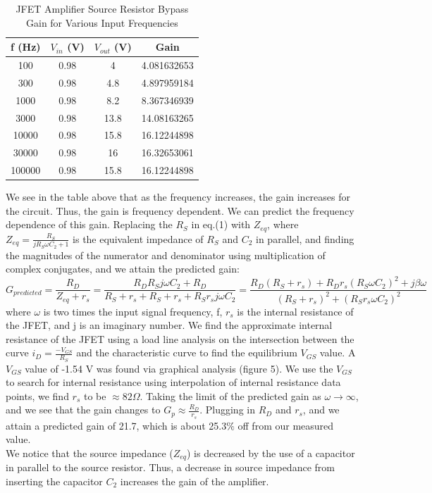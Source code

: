 \documentclass{article}
\begin{document}
    \begin{table}[H]
        \centering
        \caption{JFET Amplifier Source Resistor Bypass Gain for Various Input Frequencies}
        \label{my-label}
        \begin{tabular}{cccc}
        \textbf{f (Hz)} & \textbf{$V_{in}$ (V)} & \textbf{$V_{out}$ (V)} & \textbf{Gain} \\ \hline
        100 & 0.98 & 4 & 4.081632653 \\
        300 & 0.98 & 4.8 & 4.897959184 \\
        1000 & 0.98 & 8.2 & 8.367346939 \\
        3000 & 0.98 & 13.8 & 14.08163265 \\
        10000 & 0.98 & 15.8 & 16.12244898 \\
        30000 & 0.98 & 16 & 16.32653061 \\
        100000 & 0.98 & 15.8 & 16.12244898
        \end{tabular}
    \end{table}
    We see in the table above that as the frequency increases, the gain increases for the circuit. Thus, the gain is frequency dependent. We can predict the frequency dependence of this gain. Replacing the $R_S$ in eq.(1) with $Z_{eq}$, where $Z_{eq} = \frac{R_S}{jR_S \omega C_2 + 1}$ is the equivalent impedance of $R_S$ and $C_2$ in parallel, and finding the magnitudes of the numerator and denominator using multiplication of complex conjugates, and we attain the predicted gain:
    \begin{equation}
        G_{predicted} = \frac{R_D}{Z_{eq} + r_s} = \frac{R_D R_S j \omega C_2 + R_D}{R_S + r_s + R_S + r_s + R_S r_s j \omega C_2} = \frac{R_D(R_S + r_s) + R_D r_s (R_S\omega C_2)^{2} + j\beta \omega}{(R_S + r_s)^{2} + (R_S r_s \omega C_2)^{2}}
    \end{equation}
    where $\omega$ is two times the input signal frequency, f, $r_s$ is the internal resistance of the JFET, and j is an imaginary number. We find the approximate internal resistance of the JFET using a load line analysis on the intersection between the curve $i_D = \frac{-V_{GS}}{R_S}$ and the characteristic curve to find the equilibrium $V_{GS}$ value. A $V_{GS}$ value of -1.54 V was found via graphical analysis (figure 5). We use the $V_{GS}$ to search for internal resistance using interpolation of internal resistance data points, we find $r_s$ to be $\approx 82\Omega$. Taking the limit of the predicted gain as $\omega \rightarrow \infty$, and we see that the gain changes to $G_p \approx \frac{R_D}{r_s}$. Plugging in $R_D$ and $r_s$, and we attain a predicted gain of 21.7, which is about 25.3$\%$ off from our measured value.\\\indent We notice that the source impedance ($Z_{eq}$) is decreased by the use of a capacitor in parallel to the source resistor. Thus, a decrease in source impedance from inserting the capacitor $C_2$ increases the gain of the amplifier.
\end{document}
